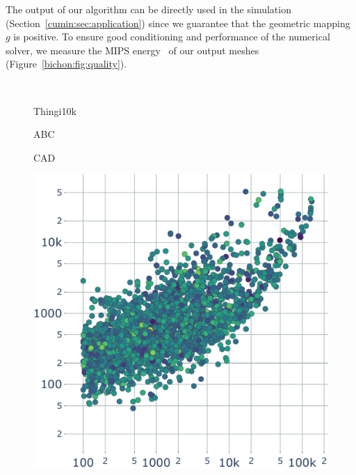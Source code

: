 The output of our algorithm can be directly used in {the} simulation (Section~\ref{cumin:sec:application}) since we guarantee that the geometric mapping $g$ is positive. To ensure good conditioning and performance of the numerical solver, we measure the MIPS energy~\cite{hormann2000mips,fu2015computing} of our output meshes (Figure~\ref{bichon:fig:quality}). 

\begin{figure}
    \centering
    \parbox{0.02\linewidth}{~}\hfill\hfill
    \parbox{.3\linewidth}{\centering Thingi10k}\hfill
    \parbox{.3\linewidth}{\centering ABC}\hfill
    \parbox{.3\linewidth}{\centering CAD}\par
    \parbox{0.02\linewidth}{\centering{}}\hfill\hfill
    \parbox{.3\linewidth}{\includegraphics[width=\linewidth]{curve_meshing_in_shell_tex/figs/stats/time_Thingi10k}}\hfill

\end{figure}
